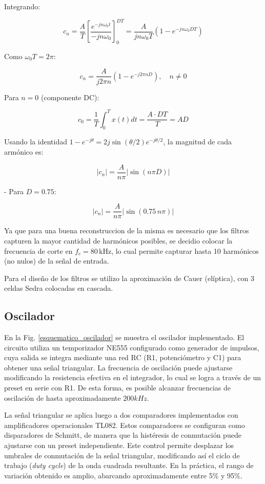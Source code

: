 Integrando:

\[
c_n = \frac{A}{T} \left[ \frac{e^{-j n \omega_0 t}}{-j n \omega_0} \right]_0^{D T}
= \frac{A}{j n \omega_0 T} \left( 1 - e^{-j n \omega_0 D T} \right)
\]

Como $\omega_0 T = 2 \pi$:

\[
c_n = \frac{A}{j 2 \pi n} \left( 1 - e^{-j 2 \pi n D} \right), \quad n \neq 0
\]

Para $n = 0$ (componente DC):

\[
c_0 = \frac{1}{T} \int_0^T x(t) dt = \frac{A \cdot D T}{T} = A D
\]



Usando la identidad $1 - e^{-j \theta} = 2 j \sin(\theta/2) e^{-j \theta/2}$, la magnitud de cada armónico es:

\[
|c_n| = \frac{A}{n \pi} \left| \sin(n \pi D) \right|
\]

- Para $D = 0.75$:

\[
|c_n| = \frac{A}{n \pi} \left| \sin(0.75 \, n \pi) \right|
\]

Ya que para una buena reconstruccion de la misma es necesario que los filtros
capturen la mayor cantidad de harmónicos posibles, se decidio colocar
la frecuencia de corte en $f_c = 80 \,\text{kHz}$, lo cual permite capturar 
hasta 10 harmónicos (no nulos) de la señal de entrada.

Para el diseño de los filtros se utilizo la aproximación de Cauer (elíptica), 
con 3 celdas Sedra colocadas en cascada.

\subsection{Oscilador}
En la Fig. \ref{esquematico_oscilador} se muestra el oscilador implementado. El circuito utiliza un temporizador NE555 configurado como generador de impulsos, cuya salida se integra mediante una red RC (R1, potenciómetro y C1) para obtener una señal triangular. La frecuencia de oscilación puede ajustarse modificando la resistencia efectiva en el integrador, lo cual se logra a través de un preset en serie con R1. De esta forma, es posible alcanzar frecuencias de oscilación de hasta aproximadamente $200kHz$.

La señal triangular se aplica luego a dos comparadores implementados con amplificadores operacionales TL082. Estos comparadores se configuran como disparadores de Schmitt, de manera que la histéresis de conmutación puede ajustarse con un preset independiente. Este control permite desplazar los umbrales de conmutación de la señal triangular, modificando así el ciclo de trabajo (\textit{duty cycle}) de la onda cuadrada resultante. En la práctica, el rango de variación obtenido es amplio, abarcando aproximadamente entre 5\% y 95\%.

